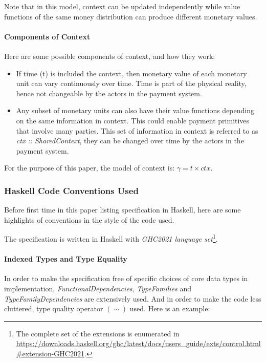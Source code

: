 Note that in this model, context can be updated independently while value functions of the same
money distribution can produce different monetary values.

\paragraph{Components of Context}

Here are some possible components of context, and how they work:

\begin{itemize}
    \item If time (t) is included the context, then monetary value of each monetary unit can vary
continuously over time. Time is part of the physical reality, hence not changeable by the actors in
the payment system.

    \item Any subset of monetary units can also have their value functions depending on the same
information in context. This could enable payment primitives that involve many parties. This set of
information in context is referred to as \textit{ctx :: SharedContext}, they can be changed over
time by the actors in the payment system.
\end{itemize}

For the purpose of this paper, the model of context is: $\gamma = t \times ctx$.

\subsubsection{Haskell Code Conventions Used}

Before first time in this paper listing specification in Haskell, here are some highlights of
conventions in the style of the code used.

The specification is written in Haskell with \textit{GHC2021 language set}\footnote{The complete set
of the extensions is enumerated in
\url{https://downloads.haskell.org/ghc/latest/docs/users_guide/exts/control.html\#extension-GHC2021}.}.

\paragraph{Indexed Types and Type Equality}

In order to make the specification free of specific choices of core data types in
implementation, \textit{FunctionalDependencies}, \textit{TypeFamilies}
and \textit{TypeFamilyDependencies} are extensively used. And in order to make the code less
cluttered, type quality operator $(\sim)$
used. Here is an example:


